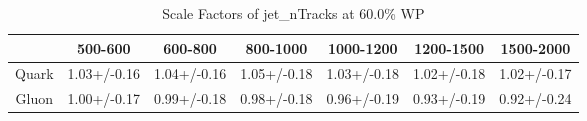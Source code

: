 \begin{table}
\centering
\caption{Scale Factors of jet_nTracks at 60.0\% WP}
\label{tab:jet_nTracks_0.6_Gluon}
\begin{tabular}{ccccccc}
\toprule
{} &      500-600 &      600-800 &     800-1000 &    1000-1200 &    1200-1500 &    1500-2000 \\
\midrule
Quark &  1.03+/-0.16 &  1.04+/-0.16 &  1.05+/-0.18 &  1.03+/-0.18 &  1.02+/-0.18 &  1.02+/-0.17 \\
Gluon &  1.00+/-0.17 &  0.99+/-0.18 &  0.98+/-0.18 &  0.96+/-0.19 &  0.93+/-0.19 &  0.92+/-0.24 \\
\bottomrule
\end{tabular}
\end{table}
